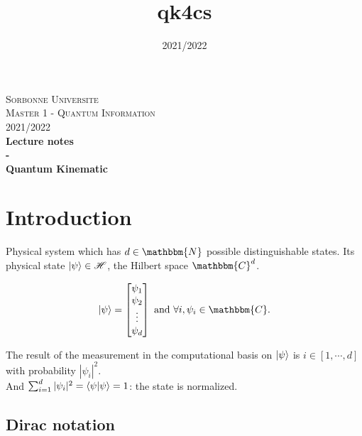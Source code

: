 \documentclass{article}
\title{qk4cs}
\author{}
\date{2021/2022}
\begin{document}
\begin{titlepage}
\begin{center}

\textsc{\LARGE Sorbonne Universite} \\[1cm]
\textsc{\LARGE Master 1 - Quantum Information} \\[1cm]
\textsc{\Large 2021/2022} \\[7cm]


{\huge \bfseries Lecture notes} \\[0.5cm]
{\huge \bfseries -} \\[0.5cm]
{\huge \bfseries Quantum Kinematic} \\[4cm]
\vfill
\end{center}
\end{titlepage}

\tableofcontents

\newpage

\section{Introduction}
Physical system which has $d \in \mathbbm{N}$ possible distinguishable states.
Its physical state $\ket{\psi} \in \mathscr{H}$, the Hilbert space
$\mathbbm{C}^d$.

\begin{equation}
    \ket{\psi} = \begin{bmatrix} \psi_1\\ \psi_2 \\ \vdots \\ \psi_d\end{bmatrix}
    \text{ and } \forall i, \psi_i \in \mathbbm{C}.
\end{equation}


\noindent
The result of the measurement in the computational basis on $\ket{\psi}$ is $i
\in [1, \cdots, d]$ with probability $|\psi_i|^2$. \\ \noindent And
$\sum_{i=1}^d |\psi_i|^2 = \braket{\psi|\psi} = 1$: the state is normalized.

\subsection{Dirac notation}
\end{document}
